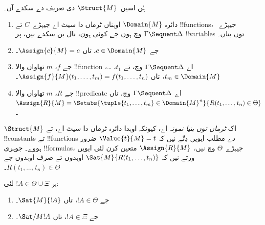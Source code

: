 \documentclass[../../../include/open-logic-section]{subfiles}
\begin{document}
ہُن اسیں~$\Struct{M}$ دی تعریف دے سکدے آں۔
\begin{enumerate}
\item دائرہ $\Domain{M}$ اوہناں ٹرماں دا سیٹ اے جیہڑے~$C$ تے !!{function}s، جیہڑے~$\Gamma \Sequent \Delta$ وچ ہون جے کوئی ہون، نال بن سکدے نیں، پر !!{variable}s توں بناں۔
\item جے $c \in \Domain{M}$، تاں $\Assign{c}{M} = c$۔
\item جے $f$، $m$ تھاواں والا !!{function} اے $ \Gamma \Sequent \Delta$ وچ، تے $t_1$، \dots، $t_m \in \Domain{M}$، تاں $\Assign{f}{M}(t_1, \dots, t_m) =
f(t_1, \dots, t_n)$۔
\item جے $R$، $m$ تھاواں والا !!{predicate} اے $ \Gamma \Sequent
\Delta$ وچ، تاں $\Assign{R}{M} = \Setabs{\tuple{t_1, \dots, t_m} \in
\Domain{M}^n}{R(t_1, \dots, t_n) \in \Theta}$۔
\end{enumerate}
$\Struct{M}$ اک \emph{ٹرماں توں بنیا نمونہ} اے، کیونکہ اوہدا دائرہ ٹرماں دا سیٹ اے، تے !!{constant}s تے !!{function}s دے مطلب ایویں دِتّے نیں کہ $\Value{t}{M} = t$ ضرور ہووے۔ جوہری !!{formula}s، جیہڑے~$\Theta$ وچ نیں، $\Assign{R}{M}$ متعین کرن لئی ایویں ورتے نیں کہ $\Sat{M}{R(t_1, \dots, t_n)}$ اوہدوں تے صرف اوہدوں جے $R(t_1, \dots, t_n)
\in \Theta$۔

\begin{lem}
ہر $!A \in \Theta \cup \Xi$ لئی:
\begin{enumerate}
  \item جے $!A \in \Theta$، تاں $\Sat{M}{!A}$۔
  \item جے $!A \in \Xi$، تاں $\Sat/{M}{!A}$۔
\end{enumerate}
\end{lem}
\end{document}
